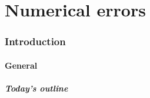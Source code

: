 \part{Numerical errors}
\section{Introduction}
\subsection*{General}
\begin{frame}[label=contents_err]
  \frametitle{Today's outline}
\end{frame}


